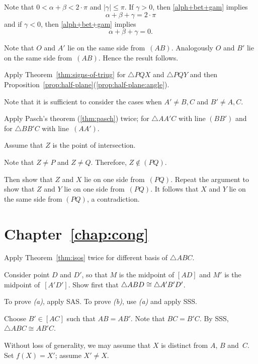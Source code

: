 Note that $0<\alpha+\beta<2\cdot\pi$ and $|\gamma|\le \pi$.
If $\gamma> 0$, then \ref{alph+bet+gam} implies
$$\alpha+\beta+\gamma=2\cdot\pi$$
and 
if $\gamma<0$, then \ref{alph+bet+gam} implies
$$\alpha+\beta+\gamma=0.$$


Note that $O$ and $A'$
lie on the same side from~$(AB)$.
Analogously $O$ and $B'$
lie on the same side from~$(AB)$.
Hence the result follows.


Apply Theorem~\ref{thm:signs-of-triug} for $\triangle PQX$ and $\triangle PQY$ and then 
Proposition~\ref{prop:half-plane}(\ref{prop:half-plane:angle}).

Note that it is sufficient to consider the cases when $A'\ne B,C$ and $B'\ne A, C$.

Apply Pasch's theorem (\ref{thm:pasch}) twice;
for $\triangle AA'C$ with line $(BB')$
and for $\triangle BB'C$ with line~$(AA')$.

Assume that $Z$ is the point of intersection.

Note that $Z\ne P$ and $Z\ne Q$.
Therefore, $Z\notin (PQ)$.

Then show that $Z$ and $X$ lie on one side from~$(PQ)$.
Repeat the argument to show that $Z$ and $Y$ lie on one side from~$(PQ)$.
It follows that $X$ and $Y$ lie on the same side from $(PQ)$, a contradiction.


\section*{Chapter~\ref{chap:cong}}
\setcounter{eqtn}{0}

Apply Theorem~\ref{thm:isos} twice for different basis of $\triangle ABC$.

Consider point $D$ and $D'$, so that 
$M$ is the midpoint of $[AD]$
and 
$M'$ is the midpoint of~$[A'D']$.
Show first that $\triangle ABD\z\cong \triangle A'B'D'$.

 To prove \textit{(a)}, apply SAS.
To prove \textit{(b)}, use \textit{(a)} and apply SSS.

Choose $B'\in [AC]$ such that $AB=AB'$.
Note that $BC=B'C$.
By SSS, 
 $\triangle ABC\cong AB'C$.

Without loss of generality, we may assume that $X$ is distinct from $A$, $B$ and~$C$.
Set $f(X)=X'$; assume $X'\ne X$.

